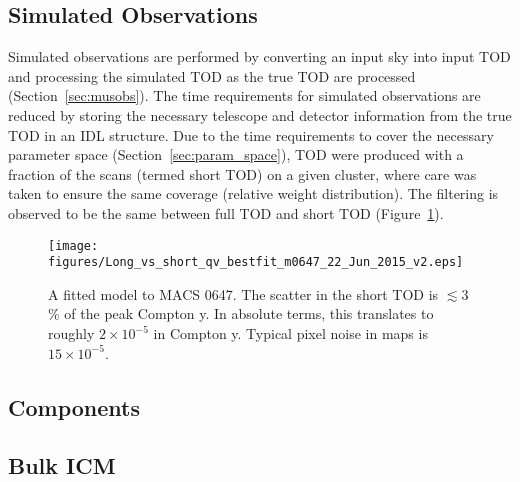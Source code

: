 \documentclass[iop,numberedappendix,apj]{emulateapj}
\begin{document}
\subsection{Simulated Observations}
\label{sec:jf_filtering}

Simulated observations are performed by converting an input sky into input TOD and processing the simulated TOD
as the true TOD are processed (Section~\ref{sec:musobs}). The time requirements for simulated observations are  
reduced by storing the necessary telescope and detector information from the true TOD in an IDL structure. 
Due to the time requirements to cover the
necessary parameter space (Section~\ref{sec:param_space}), TOD were produced with a fraction of the scans (termed
short TOD) on a given cluster, where care was taken to ensure the same coverage (relative weight distribution). 
The filtering is observed to be the same between full TOD and short TOD (Figure~\ref{fig:long_vs_short_qv}). 

\begin{figure}[!h]
  \centering
  \texttt{[image: figures/Long\_vs\_short\_qv\_bestfit\_m0647\_22\_Jun\_2015\_v2.eps]}
  \caption{A fitted model to MACS 0647. The scatter in the short TOD is $\lesssim 3$\% 
    of the peak Compton y. In absolute terms, this translates to roughly $2\times 10^{-5}$ in Compton y. 
    Typical pixel noise in maps is $15 \times 10^{-5}$.}
  \label{fig:long_vs_short_qv}
\end{figure}

\subsection{Components}
\label{sec:components}

\subsection{Bulk ICM}
\label{sec:bulk_ICM}
\end{document}
